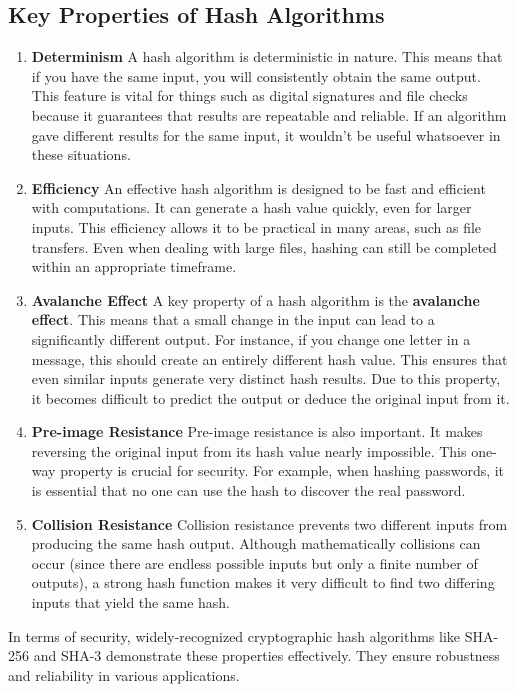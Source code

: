 \documentclass[11pt,a4paper]{article}
\begin{document}
    \subsection*{Key Properties of Hash Algorithms}
        \begin{enumerate}
            \item \textbf{Determinism}
            \newline
            A hash algorithm is deterministic in nature. This means that if you have the same input, you will consistently obtain the same output. This feature is vital for things such as digital signatures and file checks because it guarantees that results are repeatable and reliable. If an algorithm gave different results for the same input, it wouldn’t be useful whatsoever in these situations.

            \item \textbf{Efficiency}
            \newline
            An effective hash algorithm is designed to be fast and efficient with computations. It can generate a hash value quickly, even for larger inputs. This efficiency allows it to be practical in many areas, such as file transfers. Even when dealing with large files, hashing can still be completed within an appropriate timeframe.

            \item \textbf{Avalanche Effect}
            \newline
            A key property of a hash algorithm is the \textbf{avalanche effect}. This means that a small change in the input can lead to a significantly different output. For instance, if you change one letter in a message, this should create an entirely different hash value. This ensures that even similar inputs generate very distinct hash results. Due to this property, it becomes difficult to predict the output or deduce the original input from it.

            \item \textbf{Pre-image Resistance}
            \newline
            Pre-image resistance is also important. It makes reversing the original input from its hash value nearly impossible. This one-way property is crucial for security. For example, when hashing passwords, it is essential that no one can use the hash to discover the real password.

            \item \textbf{Collision Resistance}
            \newline
            Collision resistance prevents two different inputs from producing the same hash output. Although mathematically collisions can occur (since there are endless possible inputs but only a finite number of outputs), a strong hash function makes it very difficult to find two differing inputs that yield the same hash.

        \end{enumerate}
        In terms of security, widely-recognized cryptographic hash algorithms like SHA-256 and SHA-3 demonstrate these properties effectively. They ensure robustness and reliability in various applications.
\end{document}
